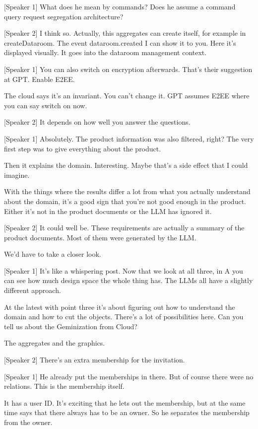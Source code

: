[Speaker 1]
What does he mean by commands? Does he assume a command query request segregation architecture?

[Speaker 2]
I think so. Actually, this aggregates can create itself, for example in createDataroom. The event dataroom.created I can show it to you. Here it's displayed visually. It goes into the dataroom management context.

[Speaker 1]
You can also switch on encryption afterwards. That's their suggestion at GPT. Enable E2EE.

The cloud says it's an invariant. You can't change it. GPT assumes E2EE where you can say switch on now.

[Speaker 2]
It depends on how well you answer the questions.

[Speaker 1]
Absolutely. The product information was also filtered, right? The very first step was to give everything about the product.

Then it explains the domain. Interesting. Maybe that's a side effect that I could imagine.

With the things where the results differ a lot from what you actually understand about the domain, it's a good sign that you're not good enough in the product. Either it's not in the product documents or the LLM has ignored it.

[Speaker 2]
It could well be. These requirements are actually a summary of the product documents. Most of them were generated by the LLM.

We'd have to take a closer look.

[Speaker 1]
It's like a whispering post. Now that we look at all three, in A you can see how much design space the whole thing has. The LLMs all have a slightly different approach.

At the latest with point three it's about figuring out how to understand the domain and how to cut the objects. There's a lot of possibilities here. Can you tell us about the Geminization from Cloud?

The aggregates and the graphics.

[Speaker 2]
There's an extra membership for the invitation.

[Speaker 1]
He already put the memberships in there. But of course there were no relations. This is the membership itself.

It has a user ID. It's exciting that he lets out the membership, but at the same time says that there always has to be an owner. So he separates the membership from the owner.

